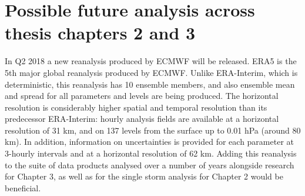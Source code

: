 





\section{Possible future analysis across thesis chapters 2 and 3}


In Q2 2018 a new reanalysis produced by ECMWF will be released. ERA5 is the 5th major global reanalysis produced by ECMWF. Unlike ERA-Interim, which is deterministic, this reanalysis has 10 ensemble members, and also ensemble mean and spread for all parameters and levels are being produced. The horizontal resolution is considerably higher spatial and temporal resolution than its predecessor ERA-Interim: hourly analysis fields are available at a horizontal resolution of 31 km, and on 137 levels from the surface up to 0.01 hPa (around 80 km). In addition, information on uncertainties is provided for each parameter at 3-hourly intervals and at a horizontal resolution of 62 km.
Adding this reanalysis to the suite of data products analysed over a number of years alongside research for Chapter 3, as well as for the single storm analysis for Chapter 2 would be beneficial.





%

